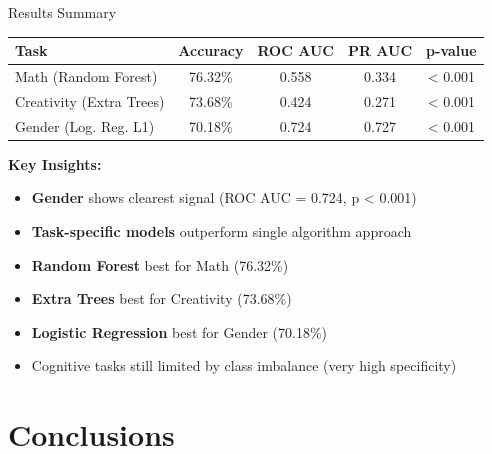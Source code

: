 \documentclass{beamer}
\begin{document}
\begin{frame}{Results Summary}
\begin{table}
\centering
\small
\begin{tabular}{lcccc}
\toprule
\textbf{Task} & \textbf{Accuracy} & \textbf{ROC AUC} & \textbf{PR AUC} & \textbf{p-value} \\
\midrule
Math (Random Forest) & 76.32\% & 0.558 & 0.334 & < 0.001 \\
Creativity (Extra Trees) & 73.68\% & 0.424 & 0.271 & < 0.001 \\
Gender (Log. Reg. L1) & 70.18\% & 0.724 & 0.727 & < 0.001 \\
\bottomrule
\end{tabular}
\end{table}

\vspace{0.3cm}

\textbf{Key Insights:}
\begin{itemize}
  \item \textbf{Gender} shows clearest signal (ROC AUC = 0.724, p < 0.001)
  \item \textbf{Task-specific models} outperform single algorithm approach
  \item \textbf{Random Forest} best for Math (76.32\%)
  \item \textbf{Extra Trees} best for Creativity (73.68\%)
  \item \textbf{Logistic Regression} best for Gender (70.18\%)
  \item Cognitive tasks still limited by class imbalance (very high specificity)
\end{itemize}
\end{frame}

\section{Conclusions}
\end{document}
